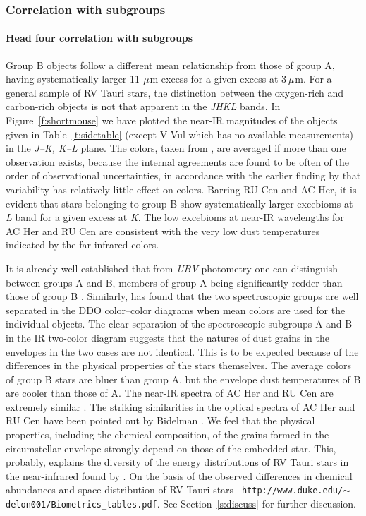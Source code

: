 \documentclass[useAMS,usenatbib]{biom}
\begin{document}
\subsubsection{Correlation with subgroups}%
\paragraph{Head four correlation with subgroups}%
Group B objects follow a different mean relationship from those of
group A, having systematically larger 11-$\mu$m excess for a given
excess at 3$\,\mu$m. For a general sample of RV Tauri stars, the
distinction between the oxygen-rich and carbon-rich objects is not
that apparent in the {\it JHKL\/} bands. In Figure~\ref{f:shortmouse}
we have plotted the near-IR magnitudes of the objects given in
Table~\ref{t:sidetable} (except V Vul which has no available
measurements) in the {\it J--K, K--L\/} plane. The colors, taken from
\citet{b9}, are averaged if more than one observation exists, because
the internal agreements are found to be often of the order of
observational uncertainties, in accordance with the earlier finding by
\citet{b5} that variability has relatively little effect on
colors. Barring RU Cen and AC Her, it is evident that stars belonging
to group B show systematically larger excebioms at {\it L\/} band for
a given excess at {\it K}. The low excebioms at near-IR wavelengths
for AC Her and RU Cen are consistent with the very low dust
temperatures indicated by the far-infrared colors.
%

It is already well established that from {\it UBV\/} photometry one
can distinguish between groups A and B, members of group A being
significantly redder than those of group B \citep{b20}.  Similarly,
\citet{b4} has found that the two spectroscopic groups are well
separated in the DDO color--color diagrams when mean colors are
used for the individual objects. The clear separation of the
spectroscopic subgroups A and B in the IR two-color diagram suggests
that the natures of dust grains in the envelopes in the two cases are
not identical. This is to be expected because of the differences in
the physical properties of the stars themselves. The average colors
of group B stars are bluer than group A, but the envelope dust
temperatures of B are cooler than those of A. The near-IR spectra of
AC Her and RU Cen are extremely similar \citep{b6}. The striking
similarities in the optical spectra of AC Her and RU Cen have been
pointed out by Bidelman \citep{b18}. We feel that the physical
properties, including the chemical composition, of the grains formed
in the circumstellar envelope strongly depend on those of the embedded
star. This, probably, explains the diversity of the energy
distributions of RV Tauri stars in the near-infrared found by
\citet{b6}. On the basis of the observed differences in chemical
abundances and space distribution of RV Tauri stars {\tt
http://www.duke.edu/$\sim$delon001/Biometrics\_tables.pdf}.  See
Section~\ref{s:discuss} for further discussion.
\end{document}
